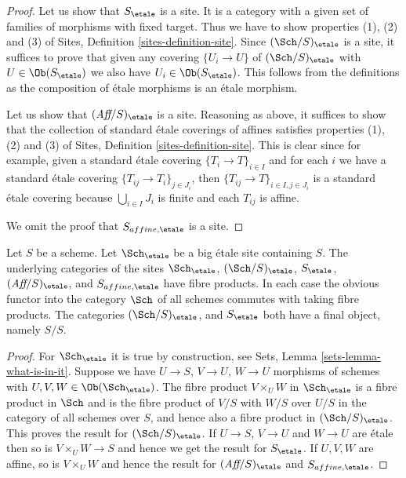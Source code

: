 \begin{proof}
Let us show that $S_\etale$ is a site. It is a category with a
given set of families of morphisms with fixed target. Thus we
have to show properties (1), (2) and (3) of
Sites, Definition \ref{sites-definition-site}.
Since $(\Sch/S)_\etale$ is a site, it suffices to prove
that given any covering $\{U_i \to U\}$ of $(\Sch/S)_\etale$
with $U \in \Ob(S_\etale)$ we also have
$U_i \in \Ob(S_\etale)$.
This follows from the definitions as the composition of \'etale morphisms
is an \'etale morphism.

\medskip\noindent
Let us show that $(\textit{Aff}/S)_\etale$ is a site.
Reasoning as above, it suffices to show that the collection
of standard \'etale coverings of affines satisfies properties
(1), (2) and (3) of
Sites, Definition \ref{sites-definition-site}.
This is clear since for example, given a standard \'etale
covering $\{T_i \to T\}_{i\in I}$ and for each
$i$ we have a standard \'etale covering $\{T_{ij} \to T_i\}_{j\in J_i}$, then
$\{T_{ij} \to T\}_{i \in I, j\in J_i}$ is a standard \'etale covering
because $\bigcup_{i\in I} J_i$ is finite and each $T_{ij}$ is affine.

\medskip\noindent
We omit the proof that $S_{affine, \etale}$ is a site.
\end{proof}

\begin{lemma}
\label{lemma-fibre-products-etale}
Let $S$ be a scheme. Let $\Sch_\etale$ be a big \'etale
site containing $S$. The underlying categories of the sites
$\Sch_\etale$, $(\Sch/S)_\etale$, $S_\etale$, $(\textit{Aff}/S)_\etale$,
and $S_{affine, \etale}$ have fibre products.
In each case the obvious functor into the category $\Sch$ of
all schemes commutes with taking fibre products. The categories
$(\Sch/S)_\etale$, and $S_\etale$ both have a
final object, namely $S/S$.
\end{lemma}

\begin{proof}
For $\Sch_\etale$ it is true by construction, see
Sets, Lemma \ref{sets-lemma-what-is-in-it}.
Suppose we have $U \to S$, $V \to U$, $W \to U$ morphisms
of schemes with $U, V, W \in \Ob(\Sch_\etale)$.
The fibre product $V \times_U W$ in $\Sch_\etale$
is a fibre product in $\Sch$ and
is the fibre product of $V/S$ with $W/S$ over $U/S$ in
the category of all schemes over $S$, and hence also a
fibre product in $(\Sch/S)_\etale$.
This proves the result for $(\Sch/S)_\etale$.
If $U \to S$, $V \to U$ and $W \to U$ are \'etale then so is
$V \times_U W \to S$ and hence we get the result for $S_\etale$.
If $U, V, W$ are affine, so is $V \times_U W$ and hence the
result for $(\textit{Aff}/S)_\etale$ and $S_{affine, \etale}$.
\end{proof}

